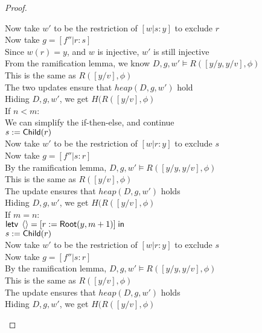 \begin{proof}
\begin{tabbedproof}
\ooooo Now take $w'$ to be the restriction of $[w|s:y]$ to exclude $r$ \\
\ooooo Now take $g = [f''|r:s]$ \\
\ooooo Since $w(r) = y$, and $w$ is injective, $w'$ is still injective \\
\ooooo From the ramification lemma, we know $D, g, w' \models R([y/y, y/v], \phi)$ \\
\ooooo This is the same as $R([y/v], \phi)$ \\
\ooooo The two updates ensure that $\mathit{heap}(D, g, w')$ hold \\
\ooooo Hiding $D, g, w'$, we get $H(R([y/v], \phi)$ \\
\oooo If $n < m$: \\
\ooooo We can simplify the if-then-else, and continue \\
\ooooo $s := \mathsf{Child}(r)$ \\
\ooooo Now take $w'$ to be the restriction of $[w|r:y]$ to exclude $s$ \\
\ooooo Now take $g = [f''|s:r]$ \\
\ooooo By the ramification lemma, $D, g, w' \models R([y/y, y/v], \phi)$ \\
\ooooo This is the same as $R([y/v], \phi)$ \\
\ooooo The update ensures that $\mathit{heap}(D, g, w')$ holds \\
\ooooo Hiding $D, g, w'$, we get $H(R([y/v], \phi)$ \\
\oooo If $m = n$: \\
\ooooo $\mathsf{letv}\;\left<\right> = [r := \mathsf{Root}(y, m+1)]\;\mathsf{in}\;$ \\
\ooooo $s := \mathsf{Child}(r)$ \\
\ooooo Now take $w'$ to be the restriction of $[w|r:y]$ to exclude $s$ \\
\ooooo Now take $g = [f''|s:r]$ \\
\ooooo By the ramification lemma, $D, g, w' \models R([y/y, y/v], \phi)$ \\
\ooooo This is the same as $R([y/v], \phi)$ \\
\ooooo The update ensures that $\mathit{heap}(D, g, w')$ holds \\
\ooooo Hiding $D, g, w'$, we get $H(R([y/v], \phi)$ \\

\end{tabbedproof}
\end{proof}


